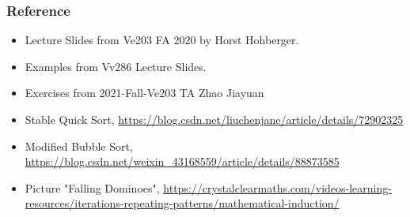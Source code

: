 \documentclass{beamer}
\begin{document}
\begin{frame}
    \frametitle{Reference}

    \begin{itemize}
        \item Lecture Slides from Ve203 FA 2020 by Horst Hohberger.
        \item Examples from Vv286 Lecture Slides.
        \item Exercises from 2021-Fall-Ve203 TA Zhao Jiayuan
        \item Stable Quick Sort, \url{https://blog.csdn.net/liuchenjane/article/details/72902325}
        \item Modified Bubble Sort, \url{https://blog.csdn.net/weixin_43168559/article/details/88873585}
        \item Picture "Falling Dominoes", \url{https://crystalclearmaths.com/videos-learning-resources/iterations-repeating-patterns/mathematical-induction/}
    \end{itemize}

\end{frame}
\end{document}
